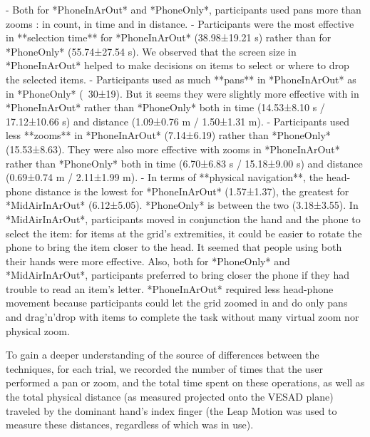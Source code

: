 - Both for *PhoneInArOut* and *PhoneOnly*, participants used pans more than zooms : in count, in time and in distance.
- Participants were the most effective in **selection time** for *PhoneInArOut* (38.98±19.21 s) rather than for *PhoneOnly* (55.74±27.54 s). We observed that the screen size in *PhoneInArOut* helped to make decisions on items to select or where to drop the selected items.
- Participants used as much **pans** in *PhoneInArOut* as in *PhoneOnly* (~30±19). But it seems they were slightly more effective with in *PhoneInArOut* rather than *PhoneOnly* both in time (14.53±8.10 s / 17.12±10.66 s) and distance (1.09±0.76 m / 1.50±1.31 m). 
- Participants used less **zooms** in *PhoneInArOut* (7.14±6.19) rather than *PhoneOnly* (15.53±8.63). They were also more effective with zooms in *PhoneInArOut* rather than *PhoneOnly* both in time (6.70±6.83 s / 15.18±9.00 s) and distance (0.69±0.74 m / 2.11±1.99 m).
- In terms of **physical navigation**, the head-phone distance is the lowest for *PhoneInArOut* (1.57±1.37), the greatest for *MidAirInArOut* (6.12±5.05). *PhoneOnly* is between the two (3.18±3.55). In *MidAirInArOut*, participants moved in conjunction the hand and the phone to select the item: for items at the grid's extremities, it could be easier to rotate the phone to bring the item closer to the head. It seemed that people using both their hands were more effective. Also, both for *PhoneOnly* and *MidAirInArOut*, participants preferred to bring closer the phone if they had trouble to read an item's letter. *PhoneInArOut* required less head-phone movement because participants could let the grid zoomed in and do only pans and drag'n'drop with items to complete the task without many virtual zoom nor physical zoom.

To gain a deeper understanding of the source of differences between
the techniques, for each trial, we recorded the number of times that the user performed a pan or zoom, and the total time spent on these operations,
as well as the total physical distance (as measured projected onto the VESAD plane) traveled by the dominant hand's index finger (the Leap Motion was used to measure these distances, regardless of which  was in use).


